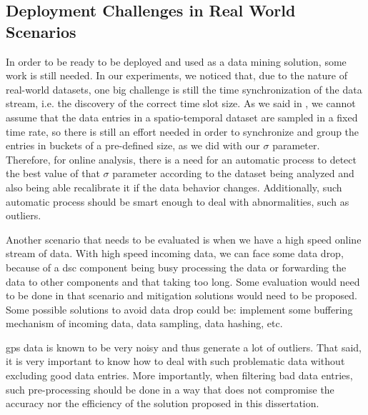 \subsection{Deployment Challenges in Real World Scenarios}
In order to be ready to be deployed and used as a data mining solution, some work is still needed. In our experiments,
we noticed that, due to the nature of real-world datasets, one big challenge is still the time synchronization of the
data stream, i.e. the discovery of the correct time slot size. As we said in , we cannot
assume that the data entries in a spatio-temporal dataset are sampled in a fixed time rate, so there is still an effort
needed in order to synchronize and group the entries in buckets of a pre-defined size, as we did with our $\sigma$
parameter. Therefore, for online analysis, there is a need for an automatic process to detect the best value of that
$\sigma$ parameter according to the dataset being analyzed and also being able recalibrate it if the data behavior
changes. Additionally, such automatic process should be smart enough to deal with abnormalities, such as outliers.

Another scenario that needs to be evaluated is when we have a high speed online stream of data. With high speed incoming
data, we can face some data drop, because of a \ac{dsc} component being busy processing the data or forwarding the data
to other components and that taking too long. Some evaluation would need to be done in that scenario and mitigation
solutions would need to be proposed. Some possible solutions to avoid data drop could be: implement some buffering
mechanism of incoming data, data sampling, data hashing, etc.

\ac{gps} data is known to be very noisy and thus generate a lot of outliers. That said, it is very important to know how
to deal with such problematic data without excluding good data entries. More importantly, when filtering bad data
entries, such pre-processing should be done in a way that does not compromise the accuracy nor the efficiency of the
solution proposed in this dissertation.
